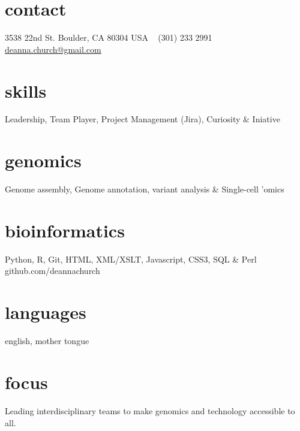 \documentclass[]{dmc-cv} %
\begin{document}


\begin{aside} %
\section{contact}
3538 22nd St.
Boulder, CA 80304
USA
~
(301) 233 2991
~
\href{mailto:deanna.church@gmail.com}{deanna.church@gmail.com}
\section{skills}
{Leadership, Team Player,
Project Management (Jira),
Curiosity \& Iniative}
\section{genomics}
{Genome assembly,
Genome annotation,
variant analysis \&
Single-cell 'omics}
\section{bioinformatics}
{Python, R, Git,
HTML, XML/XSLT, Javascript,
CSS3, SQL \& Perl
github.com/deannachurch}
\section{languages}
{english, mother tongue}
\end{aside}

\section{focus}
Leading interdisciplinary teams to make genomics and technology accessible to all.

\end{document}
